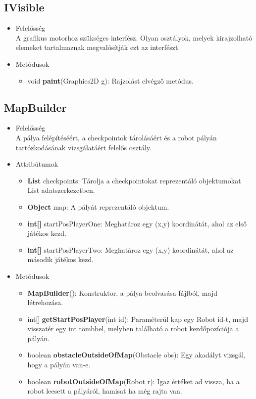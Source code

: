 \subsection{IVisible}
\begin{itemize}
\item Felelősség\\
A grafikus motorhoz szükséges interfész. Olyan osztályok, melyek kirajzolható elemeket tartalmaznak megvalósítják ezt az interfészt.
\item Metódusok
	\begin{itemize}
		\item void \textbf{paint}(Graphics2D g): Rajzolást elvégző metódus.
	\end{itemize}
\end{itemize}

\subsection{MapBuilder}
\begin{itemize}
\item Felelősség\\
A pálya felépítéséért, a checkpointok tárolásáért és a robot pályán tartózkodásának vizsgálatáért felelős osztály.
\item Attribútumok
	\begin{itemize}
		\item \textbf{List} checkpoints: Tárolja a checkpointokat reprezentáló objektumokat List adatszerkezetben.
		\item \textbf{Object} map: A pályát reprezentáló objektum.
		\item \textbf{int[]} startPosPlayerOne: Meghatároz egy (x,y) koordinátát, ahol az első játékos kezd.
		\item \textbf{int[]} startPosPlayerTwo: Meghatároz egy (x,y) koordinátát, ahol az második játékos kezd.
	\end{itemize}
\item Metódusok
	\begin{itemize}
		\item \textbf{MapBuilder}(): Konstruktor, a pálya beolvasása fájlból, majd létrehozása.
		\item int[] \textbf{getStartPosPlayer}(int id): Paraméterül kap egy Robot id-t, majd visszatér egy int tömbbel, melyben található a robot kezdőpozíciója a pályán.
		 \item boolean \textbf{obstacleOutsideOfMap}(Obstacle obs): Egy akadályt vizsgál, hogy a pályán van-e.
		\item boolean \textbf{robotOutsideOfMap}(Robot r): Igaz értéket ad vissza, ha a robot leesett a pályáról, hamisat ha még rajta van.
	\end{itemize}
\end{itemize}

